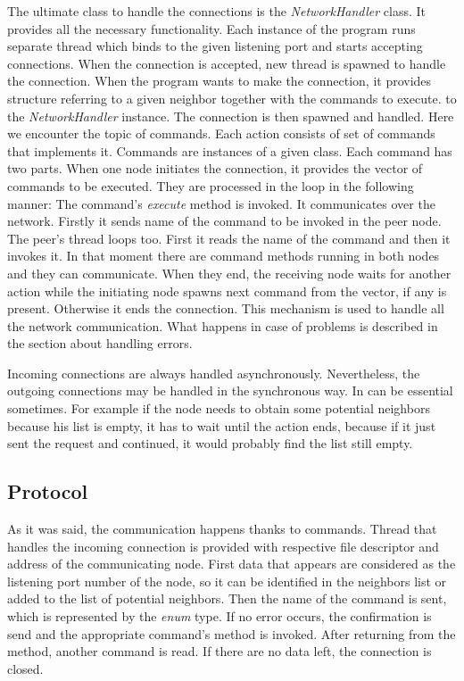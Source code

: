 The ultimate class to handle the connections is the
\textit{NetworkHandler} class. It provides all the necessary
functionality. Each instance of the program runs separate thread which
binds to the given listening port and starts accepting connections. When
the connection is accepted, new thread is spawned to handle the
connection. When the program wants to make the connection, it provides
structure referring to a given neighbor together with the commands to
execute. to the \textit{NetworkHandler} instance. The connection is then
spawned and handled. Here we encounter the topic of commands. Each
action consists of set of commands that implements it. Commands are
instances of a given class. Each command has two parts. When one node
initiates the connection, it provides the vector of commands to be
executed. They are processed in the loop in the following manner: The
command's \textit{execute} method is invoked. It communicates over the
network. Firstly it sends name of the command to be invoked in the peer
node. The peer's thread loops too. First it reads the name of the
command and then it invokes it. In that moment there are command methods
running in both nodes and they can communicate. When they end, the
receiving node waits for another action while the initiating node spawns
next command from the vector, if any is present. Otherwise it ends the
connection. This mechanism is used to handle all the network
communication. What happens in case of problems is described in the
section about handling errors.

Incoming connections are always handled asynchronously. Nevertheless,
the outgoing connections may be handled in the synchronous way. In can
be essential sometimes. For example if the node needs to obtain some
potential neighbors because his list is empty, it has to wait until the
action ends, because if it just sent the request and continued, it would
probably find the list still empty.

\subsection{Protocol}\label{protocol}

As it was said, the communication happens thanks to commands. Thread
that handles the incoming connection is provided with respective file
descriptor and address of the communicating node. First data that
appears are considered as the listening port number of the node, so it
can be identified in the neighbors list or added to the list of
potential neighbors. Then the name of the command is sent, which is
represented by the \textit{enum} type. If no error occurs, the
confirmation is send and the appropriate command's method is invoked.
After returning from the method, another command is read. If there are
no data left, the connection is closed.

